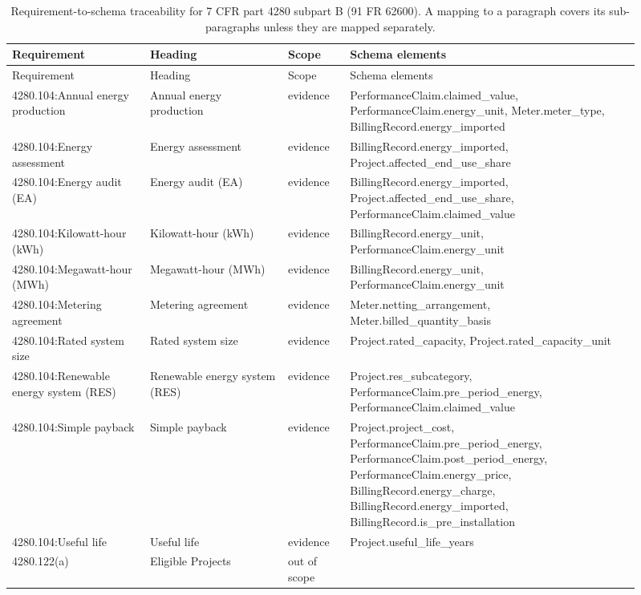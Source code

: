 \begin{longtable}{p{0.2\linewidth}p{0.2\linewidth}p{0.09\linewidth}p{0.42\linewidth}}
\caption{Requirement-to-schema traceability for 7 CFR part 4280 subpart B (91 FR 62600). A mapping to a paragraph covers its sub-paragraphs unless they are mapped separately.}\label{tab:trace-full}\\
\hline
Requirement & Heading & Scope & Schema elements \\
\hline
\endfirsthead
\hline
Requirement & Heading & Scope & Schema elements \\
\hline
\endhead
4280.104:Annual energy production & Annual energy production & evidence & PerformanceClaim.claimed\_value, PerformanceClaim.energy\_unit, Meter.meter\_type, BillingRecord.energy\_imported \\
4280.104:Energy assessment & Energy assessment & evidence & BillingRecord.energy\_imported, Project.affected\_end\_use\_share \\
4280.104:Energy audit (EA) & Energy audit (EA) & evidence & BillingRecord.energy\_imported, Project.affected\_end\_use\_share, PerformanceClaim.claimed\_value \\
4280.104:Kilowatt-hour (kWh) & Kilowatt-hour (kWh) & evidence & BillingRecord.energy\_unit, PerformanceClaim.energy\_unit \\
4280.104:Megawatt-hour (MWh) & Megawatt-hour (MWh) & evidence & BillingRecord.energy\_unit, PerformanceClaim.energy\_unit \\
4280.104:Metering agreement & Metering agreement & evidence & Meter.netting\_arrangement, Meter.billed\_quantity\_basis \\
4280.104:Rated system size & Rated system size & evidence & Project.rated\_capacity, Project.rated\_capacity\_unit \\
4280.104:Renewable energy system (RES) & Renewable energy system (RES) & evidence & Project.res\_subcategory, PerformanceClaim.pre\_period\_energy, PerformanceClaim.claimed\_value \\
4280.104:Simple payback & Simple payback & evidence & Project.project\_cost, PerformanceClaim.pre\_period\_energy, PerformanceClaim.post\_period\_energy, PerformanceClaim.energy\_price, BillingRecord.energy\_charge, BillingRecord.energy\_imported, BillingRecord.is\_pre\_installation \\
4280.104:Useful life & Useful life & evidence & Project.useful\_life\_years \\
4280.122(a) & Eligible Projects & out of scope &  \\

\end{longtable}
